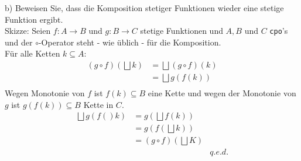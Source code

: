 \documentclass[ngerman,a4paper]{report}
\begin{document}
\begin{compactenum}
\item[b)] Beweisen Sie, dass die Komposition stetiger Funktionen wieder eine stetige Funktion ergibt.\\
Skizze: Seien $f : A \rightarrow B$ und $g : B \rightarrow C$ stetige Funktionen und $A, B$ und $C$ \lstinline!cpo!'s und der $\circ$-Operator steht - wie üblich - für die Komposition.\\
Für alle Ketten $k \subseteq A$:
\begin{align*}
(g \circ f) (\bigsqcup k) &= \bigsqcup (g \circ f) (k) \\
&= \bigsqcup g (f (k)) \\
\end{align*}
Wegen Monotonie von $f$ ist $f(k) \subseteq B$ eine Kette und wegen der Monotonie von $g$ ist $g(f(k)) \subseteq B$ Kette in $C$.
\begin{align*}
\bigsqcup g (f()k) &= g (\bigsqcup f(k))\\
&= g (f (\bigsqcup k))\\
&= (g \circ f) (\bigsqcup K)\\
&& q.e.d.\\
\end{align*}
\end{compactenum}
\end{document}
